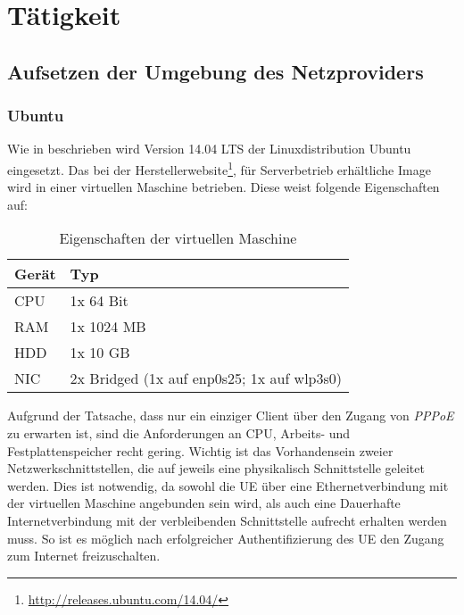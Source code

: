 \section[Tätigkeit (Schenkel \& Heumann)]{Tätigkeit}

\subsection[Aufsetzen der Umgebung des Netzproviders (Schenkel \& Heumann)]{Aufsetzen der Umgebung des Netzproviders}

	\subsubsection[Ubuntu (Schenkel)]{Ubuntu}
	Wie in  beschrieben wird Version 14.04 LTS
	der Linuxdistribution Ubuntu eingesetzt. Das bei der Herstellerwebsite\footnote{\url{http://releases.ubuntu.com/14.04/}},
	für Serverbetrieb erhältliche Image wird in einer virtuellen Maschine betrieben.
	Diese weist folgende Eigenschaften auf:

	\begin{table}[h]
	\begin{tabularx}{\textwidth}{|l|X|}
    	\hline
      		\textbf{Gerät} & \textbf{Typ} \\
    	\hline
    	\hline
    		CPU & 1x 64 Bit \\
    	\hline
    	\hline
    		RAM & 1x 1024 MB \\
    	\hline
    	\hline
    		HDD & 1x 10 GB \\
    	\hline
    	\hline
    		NIC & 2x Bridged (1x auf enp0s25; 1x auf wlp3s0) \\
    	\hline
    	\end{tabularx}
       	\caption{Eigenschaften der virtuellen Maschine}
       	\end{table}

    	Aufgrund der Tatsache, dass nur ein einziger Client über den Zugang von \textit{PPPoE}
    	zu erwarten ist, sind die Anforderungen an CPU, Arbeits- und Festplattenspeicher
    	recht gering. Wichtig ist das Vorhandensein zweier Netzwerkschnittstellen, die
    	auf jeweils eine physikalisch Schnittstelle geleitet werden. Dies ist notwendig,
    	da sowohl die UE über eine Ethernetverbindung mit der virtuellen Maschine angebunden sein wird,
    	als auch eine Dauerhafte Internetverbindung mit der verbleibenden Schnittstelle
    	aufrecht erhalten werden muss. So ist es möglich nach erfolgreicher Authentifizierung
    	des UE den Zugang zum Internet freizuschalten.

